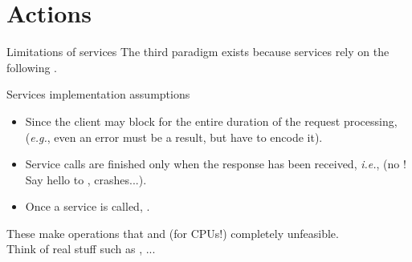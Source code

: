 
\section{Actions}
\graphicspath{{figs/section3/}}

\begin{frame}{Limitations of services}
  The third paradigm exists because services rely on the following .
  \begin{alertblock}{Services implementation assumptions}
    \begin{itemize}
      \item Since the client may block for the entire duration of the request processing,  (\emph{e.g.}, even an error must be a result, but  have to encode it).
      \item Service calls are finished only when the response has been received, \emph{i.e.},  (no ! Say hello to , crashes...).
      \item Once a service is called, .
    \end{itemize}
  \end{alertblock}
  These make operations that  and  (for CPUs!) completely unfeasible.\\
  Think of real stuff such as , ...
\end{frame}

